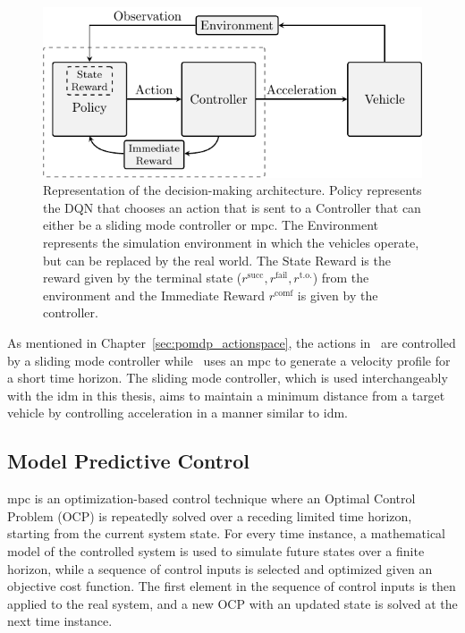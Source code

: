 \begin{figure}
	\centering
	\includegraphics[width=0.8\columnwidth]{YourThesis/papers/mpc/figures/figures-architecture.pdf}
	\caption{Representation of the decision-making architecture. Policy represents the DQN that chooses an action that is sent to a Controller that can either be a sliding mode controller or \gls{mpc}. The Environment represents the simulation environment in which the vehicles operate, but can be replaced by the real world. The State Reward is the reward given by the terminal state ($r^\mathrm{succ},r^\mathrm{fail},r^\mathrm{t.o.}$) from the environment and the Immediate Reward $r^\mathrm{comf}$ is given by the controller.}
	\label{fig:mpc_architecture}
\end{figure}

As mentioned in Chapter~\ref{sec:pomdp_actionspace}, the actions in \paperLSTM \ are controlled by a sliding mode controller while \paperMPC \ uses an \gls{mpc} to generate a velocity profile for a short time horizon. 
The sliding mode controller, which is used interchangeably with the \gls{idm} in this thesis, aims to maintain a minimum distance from a target vehicle by controlling acceleration in a manner similar to \gls{idm}.

\subsection{Model Predictive Control}
\gls{mpc} is an optimization-based control technique where an Optimal Control Problem (OCP) is repeatedly solved over a receding limited time horizon, starting from the current system state. For every time instance, a mathematical model of the controlled system is used to simulate future states over a finite horizon, while a sequence of control inputs is selected and optimized given an objective cost function. The first element in the sequence of control inputs is then applied to the real system, and a new OCP with an updated state is solved at the next time instance.

